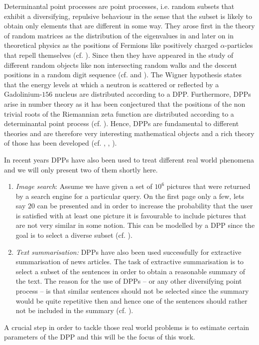 Determinantal point processes are point processes, i.e. random subsets that exhibit a diversifying, repulsive behaviour in the sense that the subset is likely to obtain only elements that are different in some way. They arose first in the theory of random matrices as the distribution of the eigenvalues in \cite{mehta1960density} and later on in theoretical physics as the positions of Fermions like positively charged \(\alpha\)-particles that repell themselves (cf. \cite{benard1973detection}). Since then they have appeared in the study of different random objects like non intersecting random walks and the descent positions in a random digit sequence (cf. \cite{johansson2004determinantal} and \cite{borodin2010adding}). The Wigner hypothesis states that the energy levels at which a neutron is scattered or reflected by a Gadolinium-\(156\) nucleus are distributed according to a DPP. Furthermore, DPPs arise in number theory as it has been conjectured that the positions of the non trivial roots of the Riemannian zeta function are distributed according to a determinantal point process (cf. \cite{bourgade2013quantum}). Hence, DPPs are fundamental to different theories and are therefore very interesting mathematical objects and a rich theory of those has been developed (cf. \cite{borodin2009determinantal}, \cite{hough2006determinantal}, \cite{lyons2003determinantal}).

In recent years DPPs have also been used to treat different real world phenomena and we will only present two of them shortly here.
\begin{enumerate}
\item \emph{Image search}: Assume we have given a set of \(10^6\) pictures that were returned by a search engine for a particular query. On the first page only a few, lets say \(20\) can be presented and in order to increase the probability that the user is satisfied with at least one picture it is favourable to include pictures that are not very similar in some notion. This can be modelled by a DPP since the goal is to select a diverse subset (cf. \cite{kulesza2011k}). %
\item \emph{Text summarisation:} DPPs have also been used successfully for extractive summarisation of news articles. The task of extractive summarisation is to select a subset of the sentences in order to obtain a reasonable summary of the text. The reason for the use of DPPs -- or any other diversifying point process -- is that similar sentences should not be selected since the summary would be quite repetitive then and hence one of the sentences should rather not be included in the summary (cf. \cite{kulesza2012learning1}). 
\end{enumerate}
A crucial step in order to tackle those real world problems is to estimate certain parameters of the DPP and this will be the focus of this work. %

